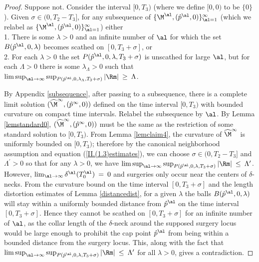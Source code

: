 \begin{proof}
Suppose not. Consider the interval $[0, T_3)$ (where we define
$[0, 0)$ to be $\{0\}$).
Given $\sigma \in (0, T_2 - T_3]$, for any subsequence
of $\{\M^\al, (\hat{p}^\al,0)\}_{\al=1}^\infty$ (which we relabel as
$\{\M^\al, (\hat{p}^\al,0)\}_{\al=1}^\infty$)
either \\
1. There is some $\lambda > 0$ and an
infinite number of $\al$
for which the set $B(\hat{p}^{\al}, 0, \lambda)$ becomes
scathed on $[0, T_3 + \sigma]$, or \\
2. For each $\lambda > 0$ the set
$P(\hat{p}^{\al}, 0, \lambda, T_3 + \sigma)$
is unscathed for large $\al$, but for each
$\Lambda > 0$ there is some
$\lambda_\Lambda > 0$ such that
$\limsup_{\al \rightarrow \infty}
\sup_{P(\hat{p}^{\al}, 0, \lambda_\Lambda, T_3 + \sigma)} |\Rm| \: \ge \: \Lambda$.

By Appendix \ref{subsequence}, after
passing to a subsequence, there is a complete limit solution
$(\widehat{\M}^\infty, (\hat{p}^\infty,0))$ defined on the time
interval $[0, T_3)$ with bounded curvature on compact time intervals.
Relabel the subsequence by $\al$. By Lemma \ref{lemstandard0},
$(\widehat{\M}^\infty, (\hat{p}^\infty,0))$ must be the same as the
restriction of some standard solution to $[0, T_3)$.
From Lemma \ref{lemclaim4}, the  curvature of $\widehat{\M}^\infty$ is uniformly
bounded on $[0, T_3)$; therefore by the canonical neighborhood assumption and equation
(\ref{II.(1.3)estimates}),
we can choose $\sigma \in (0, T_2 - T_3]$ and $\Lambda^\prime > 0$
so that for any $\lambda > 0$,  we have
$\limsup_{\al \rightarrow \infty}
\sup_{P(\hat{p}^{\al}, 0, \lambda, T_3 + \sigma)} |\Rm| \: \le \: \Lambda^\prime$.
However, $\lim_{\al \rightarrow \infty}
\delta^\al (T_0^\al) \: = \: 0$ and surgeries only occur near the
centers of $\delta$-necks. From the curvature bound on the time
interval $[0, T_3 + \sigma]$ and the length distortion
estimates of Lemma \ref{distancedist}, for a given $\lambda$ the
balls $B(\hat{p}^{\al}, 0, \lambda)$ will stay within
a uniformly bounded distance from $\hat{p}^{\al}$ on the time interval
$[0, T_3 + \sigma]$. Hence they
cannot be scathed on $[0, T_3 + \sigma]$ for an infinite number of $\al$,
as the collar length of the $\delta$-neck around the supposed surgery locus
would be large enough to prohibit the cap point $\hat{p}^{\al}$
from being within a bounded
distance from the surgery locus.
This, along with the fact that $\limsup_{\al \rightarrow \infty}
\sup_{P(\hat{p}^{\al}, 0, \lambda, T_3 + \sigma)} |\Rm| \: \le \: \Lambda^\prime$
for all $\lambda > 0$,
gives a contradiction.
\end{proof}
